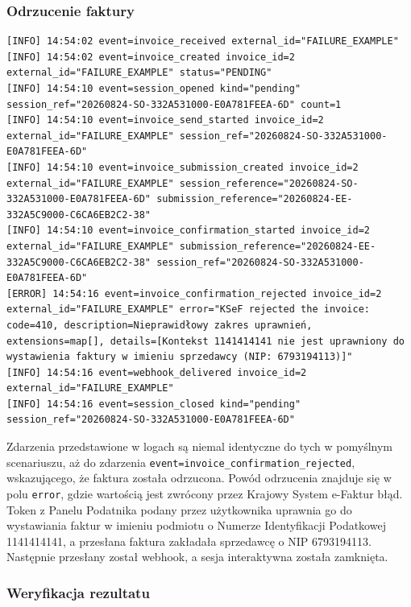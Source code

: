 \subsubsection{Odrzucenie faktury}

\begin{lstlisting}[style=thesiscode, caption={Logi odrzucenia faktury przez KSeF}, label={lst:failure-processing-logs}]
[INFO] 14:54:02 event=invoice_received external_id="FAILURE_EXAMPLE"
[INFO] 14:54:02 event=invoice_created invoice_id=2 external_id="FAILURE_EXAMPLE" status="PENDING"
[INFO] 14:54:10 event=session_opened kind="pending" session_ref="20260824-SO-332A531000-E0A781FEEA-6D" count=1
[INFO] 14:54:10 event=invoice_send_started invoice_id=2 external_id="FAILURE_EXAMPLE" session_ref="20260824-SO-332A531000-E0A781FEEA-6D"
[INFO] 14:54:10 event=invoice_submission_created invoice_id=2 external_id="FAILURE_EXAMPLE" session_reference="20260824-SO-332A531000-E0A781FEEA-6D" submission_reference="20260824-EE-332A5C9000-C6CA6EB2C2-38"
[INFO] 14:54:10 event=invoice_confirmation_started invoice_id=2 external_id="FAILURE_EXAMPLE" submission_reference="20260824-EE-332A5C9000-C6CA6EB2C2-38" session_ref="20260824-SO-332A531000-E0A781FEEA-6D"
[ERROR] 14:54:16 event=invoice_confirmation_rejected invoice_id=2 external_id="FAILURE_EXAMPLE" error="KSeF rejected the invoice: code=410, description=Nieprawidłowy zakres uprawnień, extensions=map[], details=[Kontekst 1141414141 nie jest uprawniony do wystawienia faktury w imieniu sprzedawcy (NIP: 6793194113)]"
[INFO] 14:54:16 event=webhook_delivered invoice_id=2 external_id="FAILURE_EXAMPLE"
[INFO] 14:54:16 event=session_closed kind="pending" session_ref="20260824-SO-332A531000-E0A781FEEA-6D"
\end{lstlisting}

Zdarzenia przedstawione w logach są niemal identyczne do tych w pomyślnym scenariuszu, aż do zdarzenia \texttt{event=invoice\_confirmation\_rejected}, wskazującego, że faktura została odrzucona. Powód odrzucenia znajduje się w polu \texttt{error}, gdzie wartością jest zwrócony przez Krajowy System e-Faktur błąd. Token z Panelu Podatnika podany przez użytkownika uprawnia go do wystawiania faktur w imieniu podmiotu o Numerze Identyfikacji Podatkowej 1141414141, a przesłana faktura zakładała sprzedawcę o NIP 6793194113. Następnie przesłany został webhook, a sesja interaktywna została zamknięta.

\subsubsection{Weryfikacja rezultatu}

